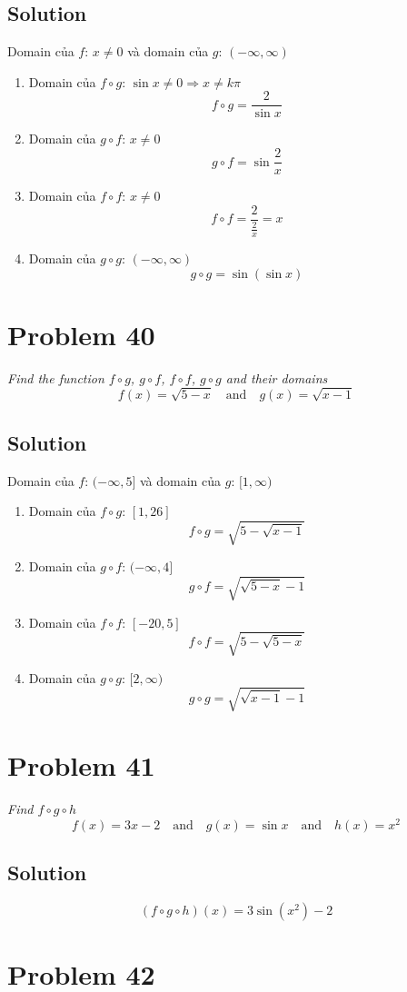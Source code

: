 \documentclass[11pt]{article}
\newcommand{\soln}{\subsection*}
\newcommand{\qn}{\textit}
\begin{document}
\soln{Solution}
Domain của $f$: $x \ne 0$ và domain của $g$: $(-\infty, \infty)$
\begin{enumerate}
	\item Domain của $f \circ g$: $\sin{x} \ne 0 \Rightarrow x \ne k\pi $ $$f \circ g=\frac{2}{\sin{x}}$$
	
	\item Domain của $g \circ f$: $x \ne 0$ $$g \circ f=\sin{\frac{2}{x}}$$
	
	\item Domain của $f \circ f$: $x \ne 0$ $$f \circ f=\frac{2}{\frac{2}{x}}=x$$
	
	\item Domain của $g \circ g$: $(-\infty, \infty)$ $$g \circ g=\sin(\sin{x})$$
\end{enumerate}

\section*{Problem 40}

\qn{Find the function $f \circ g$, $g \circ f$, $f \circ f$, $g \circ g$ and their domains $$f(x)=\sqrt{5-x} \quad \text{and} \quad g(x)=\sqrt{x-1}$$}

\soln{Solution}
Domain của $f$: $(-\infty, 5]$ và domain của $g$: $[1, \infty)$
\begin{enumerate}
	\item Domain của $f \circ g$: $[1, 26]$ $$f \circ g=\sqrt{5-\sqrt{x-1}}$$
	
	\item Domain của $g \circ f$: $(-\infty, 4]$ $$g \circ f=\sqrt{\sqrt{5-x}-1}$$
	
	\item Domain của $f \circ f$: $[-20, 5]$ $$f \circ f=\sqrt{5-\sqrt{5-x}}$$
	
	\item Domain của $g \circ g$: $[2, \infty)$ $$g \circ g=\sqrt{\sqrt{x-1}-1}$$
\end{enumerate}

\section*{Problem 41}

\qn{Find $f \circ g \circ h$ $$f(x)=3x-2 \quad \text{and} \quad g(x)=\sin{x} \quad \text{and} \quad h(x)=x^2$$}

\soln{Solution}
$$(f \circ g \circ h)(x)=3\sin(x^2)-2$$

\section*{Problem 42}
\end{document}
